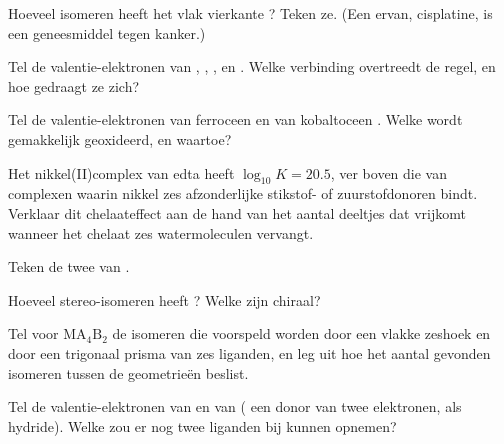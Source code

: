 \begin{exercise}[$\star\star$]\label{exo:b2:coordination-complexes:5}
Hoeveel isomeren heeft het vlak vierkante \ce{[PtCl2(NH3)2]}? Teken ze. (Een ervan,
cisplatine, is een geneesmiddel tegen kanker.)
\end{exercise}

\begin{exercise}[$\star\star$]\label{exo:b2:coordination-complexes:6}
Tel de valentie-elektronen van , , ,
 en . Welke verbinding overtreedt de regel, en hoe gedraagt ze zich?
\end{exercise}

\begin{exercise}[$\star\star$]\label{exo:b2:coordination-complexes:7}
Tel de valentie-elektronen van ferroceen en van kobaltoceen . Welke wordt
gemakkelijk geoxideerd, en waartoe?
\end{exercise}

\begin{exercise}[$\star\star$]\label{exo:b2:coordination-complexes:8}
Het nikkel(II)complex van edta heeft $\log_{10}K = 20.5$, ver boven die van complexen waarin
nikkel zes afzonderlijke stikstof- of zuurstofdonoren bindt. Verklaar dit chelaateffect
aan de hand van het aantal deeltjes dat vrijkomt wanneer het chelaat zes watermoleculen
vervangt.
\end{exercise}

\begin{exercise}[$\star\star$]\label{exo:b2:coordination-complexes:9}
Teken de twee  van .
\end{exercise}

\begin{exercise}[$\star\star\star$]\label{exo:b2:coordination-complexes:10}
Hoeveel stereo-isomeren heeft \ce{[CoCl2(en)2]+}? Welke zijn chiraal?
\end{exercise}

\begin{exercise}[$\star\star\star$]\label{exo:b2:coordination-complexes:11}
Tel voor $\mathrm{MA_4B_2}$ de isomeren die voorspeld worden door een vlakke zeshoek en door een trigonaal
prisma van zes liganden, en leg uit hoe het aantal gevonden isomeren tussen de
geometrieën beslist.
\end{exercise}

\begin{exercise}[$\star\star\star$]\label{exo:b2:coordination-complexes:12}
Tel de valentie-elektronen van  en van 
( een donor van twee elektronen,  als hydride). Welke zou er nog twee
liganden bij kunnen opnemen?
\end{exercise}

